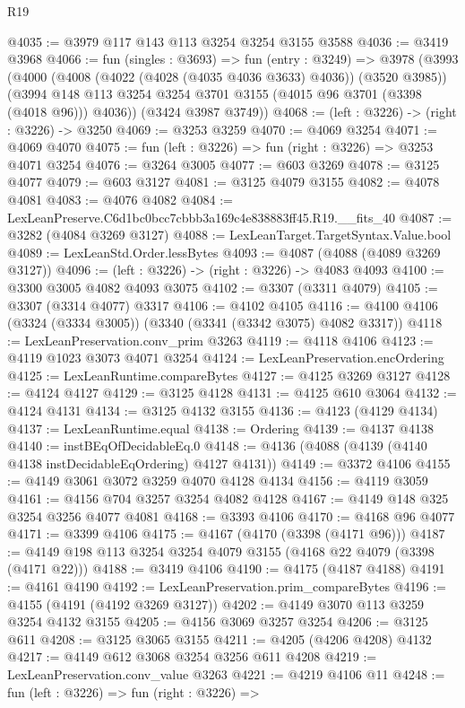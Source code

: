 \begin{lexlean}{R19}
\begin{coremodule}
@4035 := @3979 @117 @143 @113 @3254 @3254 @3155 @3588
@4036 := @3419 @3968
@4066 := fun (singles : @3693) =>
  fun (entry : @3249) =>
  @3978
    (@3993
      (@4000
        (@4008 (@4022 (@4028 (@4035 @4036 @3633) @4036)) (@3520 @3985))
        (@3994 @148 @113 @3254 @3254 @3701 @3155 (@4015 @96 @3701 (@3398 (@4018 @96))) @4036))
      (@3424 @3987 @3749))
@4068 := (left : @3226) -> (right : @3226) -> @3250
@4069 := @3253 @3259
@4070 := @4069 @3254
@4071 := @4069 @4070
@4075 := fun (left : @3226) => fun (right : @3226) => @3253 @4071 @3254
@4076 := @3264 @3005
@4077 := @603 @3269
@4078 := @3125 @4077
@4079 := @603 @3127
@4081 := @3125 @4079 @3155
@4082 := @4078 @4081
@4083 := @4076 @4082
@4084 := LexLeanPreserve.C6d1bc0bcc7cbbb3a169c4e838883ff45.R19.__fits_40
@4087 := @3282 (@4084 @3269 @3127)
@4088 := LexLeanTarget.TargetSyntax.Value.bool
@4089 := LexLeanStd.Order.lessBytes
@4093 := @4087 (@4088 (@4089 @3269 @3127))
@4096 := (left : @3226) -> (right : @3226) -> @4083 @4093
@4100 := @3300 @3005 @4082 @4093 @3075
@4102 := @3307 (@3311 @4079)
@4105 := @3307 (@3314 @4077) @3317
@4106 := @4102 @4105
@4116 := @4100 @4106 (@3324 (@3334 @3005)) (@3340 (@3341 (@3342 @3075) @4082 @3317))
@4118 := LexLeanPreservation.conv_prim @3263
@4119 := @4118 @4106
@4123 := @4119 @1023 @3073 @4071 @3254
@4124 := LexLeanPreservation.encOrdering
@4125 := LexLeanRuntime.compareBytes
@4127 := @4125 @3269 @3127
@4128 := @4124 @4127
@4129 := @3125 @4128
@4131 := @4125 @610 @3064
@4132 := @4124 @4131
@4134 := @3125 @4132 @3155
@4136 := @4123 (@4129 @4134)
@4137 := LexLeanRuntime.equal
@4138 := Ordering
@4139 := @4137 @4138
@4140 := instBEqOfDecidableEq.{0}
@4148 := @4136 (@4088 (@4139 (@4140 @4138 instDecidableEqOrdering) @4127 @4131))
@4149 := @3372 @4106
@4155 := @4149 @3061 @3072 @3259 @4070 @4128 @4134
@4156 := @4119 @3059
@4161 := @4156 @704 @3257 @3254 @4082 @4128
@4167 := @4149 @148 @325 @3254 @3256 @4077 @4081
@4168 := @3393 @4106
@4170 := @4168 @96 @4077
@4171 := @3399 @4106
@4175 := @4167 (@4170 (@3398 (@4171 @96)))
@4187 := @4149 @198 @113 @3254 @3254 @4079 @3155 (@4168 @22 @4079 (@3398 (@4171 @22)))
@4188 := @3419 @4106
@4190 := @4175 (@4187 @4188)
@4191 := @4161 @4190
@4192 := LexLeanPreservation.prim_compareBytes
@4196 := @4155 (@4191 (@4192 @3269 @3127))
@4202 := @4149 @3070 @113 @3259 @3254 @4132 @3155
@4205 := @4156 @3069 @3257 @3254
@4206 := @3125 @611
@4208 := @3125 @3065 @3155
@4211 := @4205 (@4206 @4208) @4132
@4217 := @4149 @612 @3068 @3254 @3256 @611 @4208
@4219 := LexLeanPreservation.conv_value @3263
@4221 := @4219 @4106 @11
@4248 := fun (left : @3226) =>
  fun (right : @3226) =>

\end{coremodule}
\end{lexlean}
